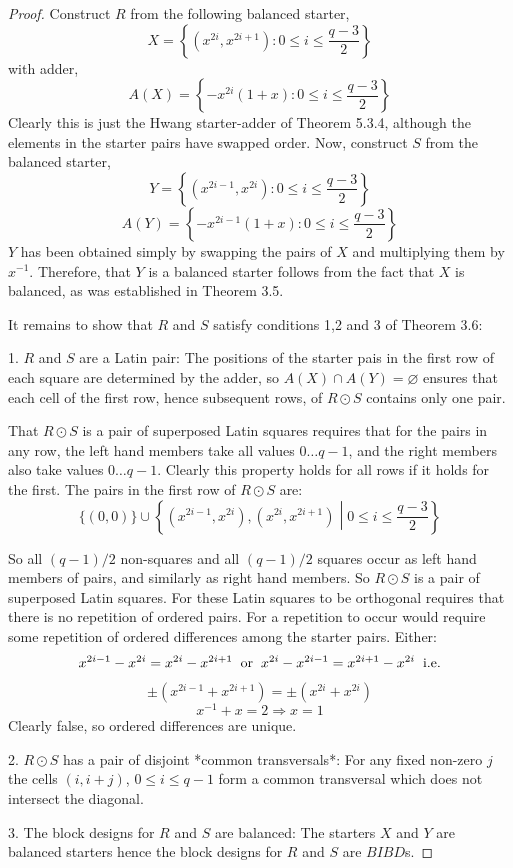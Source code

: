 \documentclass[
  11pt,
  a4paper]{book}
\begin{document}
\begin{proof}
Construct $R$ from the following balanced starter,
$$X = \left \{ (x^{2i},x^{2i+1}):0 \leq i \leq \frac{q-3}{2} \right \}$$
with adder,
$$A(X) = \left \{ -x^{2i}(1+x):0 \leq i \leq \frac{q-3}{2} \right \}$$
Clearly this is just the Hwang starter-adder of Theorem
5.3.4, although the elements in the starter pairs have
swapped order. Now, construct $S$ from the balanced starter,
$$Y = \left \{ (x^{2i-1},x^{2i}):0 \leq i \leq \frac{q-3}{2} \right \}$$
$$A(Y) = \left \{ -x^{2i-1}(1+x):0 \leq i \leq \frac{q-3}{2} \right \}$$
$Y$ has been obtained simply by swapping the pairs of $X$
and multiplying them by $x^{-1}$. Therefore, that $Y$ is a
balanced starter follows from the fact that $X$ is balanced,
as was established in Theorem 3.5.

It remains to show that $R$ and $S$ satisfy conditions 1,2
and 3 of Theorem 3.6:

  1.  $R$ and $S$ are a Latin pair: The positions of the
      starter pais in the first row of each square are
      determined by the adder, so
      $A(X) \cap A(Y) = \varnothing$ ensures that each
      cell of the first row, hence subsequent rows, of
      $R \odot S$ contains only one pair.
      
      That $R \odot S$ is a pair of superposed Latin squares
      requires that for the pairs in any row, the left hand
      members take all values $0\ldots q - 1$, and the right
      members also take values $0\ldots q - 1$.  Clearly this
      property holds for all rows if it holds for the first.
      The pairs in the first row of $R \odot S$ are:
      $$\{(0,0)\} \cup \left \{ (x^{2i-1},x^{2i}),(x^{2i},x^{2i+1}) \middle| 0 \leq i \leq \frac{q-3}{2} \right \}$$
      
      So all $(q - 1)/2$ non-squares and all $(q - 1)/2$
      squares occur as left hand members of pairs, and
      similarly as right hand members. So $R \odot S$ is a
      pair of superposed Latin squares.  For these Latin
      squares to be orthogonal requires that there is no
      repetition of ordered pairs.  For a repetition to
      occur would require some repetition of ordered
      differences among the starter pairs.  Either:
      $$x^{2i-1} - x^{2i} = x^{2i} - x^{2i+1} \hspace{0.2cm} \mathrm{or} \hspace{0.2cm} x^{2i} - x^{2i-1} = x^{2i+1} - x^{2i} \hspace{0.2cm} \mathrm{i.e.}$$ $$\pm (x^{2i-1} + x^{2i+1}) = \pm (x^{2i} + x^{2i})$$ $$x^{-1} + x = 2 \Rightarrow x = 1$$
      Clearly false, so ordered differences are unique.

  2.  $R \odot S$ has a pair of disjoint *common
      transversals*: For any fixed non-zero $j$ the cells
      $(i, i + j)$, $0 \leq i \leq q - 1$ form a common
      transversal which does not intersect the diagonal.

  3.  The block designs for $R$ and $S$ are balanced: The
      starters $X$ and $Y$ are balanced starters hence the
      block designs for $R$ and $S$ are $BIBD$s.
\end{proof}
\end{document}
